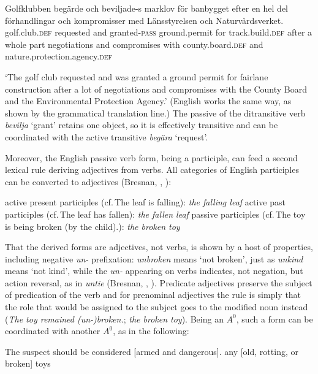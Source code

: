 \ea
{\raggedright
\gll Golfklubben beg\"arde och beviljade-s marklov f\"or banbygget efter en hel del f\"orhandlingar och kompromisser med L\"ansstyrelsen och 
Naturv\aa rdsverket.\footnotemark\\
golf.club.\textsc{def} requested and granted-\textsc{pass} ground.permit for track.build.\textsc{def} after a whole part negotiations and compromises with county.board.\textsc{def} and nature.protection.agency.\textsc{def} \\
\par}
\glt `The golf club requested and was granted a ground permit for fairlane construction after a lot of negotiations and compromises with the County Board and the Environmental Protection Agency.'
\z
\noindent
(English works the same way, as shown by the grammatical translation line.)  
The passive of the ditransitive verb \emph{bevilja} `grant' retains one object, so it is effectively
transitive and can be coordinated with the active transitive \emph{beg\"ara} `request'. 

Moreover, the English passive verb form, being a participle, can feed a second lexical rule deriving
adjectives from verbs.  All categories of English participles can be converted to adjectives
(Bresnan, \citeyear{Bresnan82a}, \citeyear[Chapter~3]{Bresnan2001a}):

\eal
\ex active present participles (cf.\,The leaf is falling): \emph{the falling leaf} 
\ex active past participles (cf.\,The leaf has fallen): \emph{the fallen leaf} 
\ex passive participles (cf.\,The toy is being broken (by the child).): \emph{the broken toy} 
\zl

\noindent
That the derived forms are adjectives, not verbs, is shown by a host of properties, including
negative \emph{un-} prefixation: \emph{unbroken} means `not broken', just as \emph{unkind} means
`not kind', while the \emph{un-} appearing on verbs indicates, not negation, but action reversal, as
in \emph{untie} (Bresnan, \citeyear[]{Bresnan82a}, \citeyear[Chapter~3]{Bresnan2001a}).  Predicate adjectives preserve the subject of predication of the verb and for
prenominal adjectives the rule is simply that the role that would be assigned to the subject goes to
the modified noun instead (\emph{The toy remained (un-)broken.}; \emph{the broken toy}).  Being an
$A^0$, such a form can be coordinated with another $A^0$, as in the following:

\eal
\ex The suspect should be considered [armed and dangerous].
\ex any [old, rotting, or broken] toys
\zl

